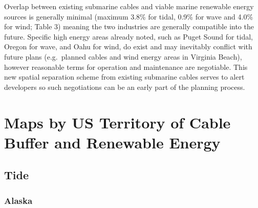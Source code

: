 \documentclass[]{article}
\begin{document}
Overlap between existing submarine cables and viable marine renewable
energy sources is generally minimal (maximum 3.8\% for tidal, 0.9\% for
wave and 4.0\% for wind; Table 3) meaning the two industries are
generally compatible into the future. Specific high energy areas already
noted, such as Puget Sound for tidal, Oregon for wave, and Oahu for
wind, do exist and may inevitably conflict with future plans
(e.g.~planned cables and wind energy areas in Virginia Beach), however
reasonable terms for operation and maintenance are negotiable. This new
spatial separation scheme from existing submarine cables serves to alert
developers so such negotiations can be an early part of the planning
process.

\newpage

\hypertarget{appendix-appendix}{%
\appendix}


\hypertarget{maps-by-us-territory-of-cable-buffer-and-renewable-energy}{%
\section{Maps by US Territory of Cable Buffer and Renewable
Energy}\label{maps-by-us-territory-of-cable-buffer-and-renewable-energy}}

\hypertarget{tide}{%
\subsection{Tide}\label{tide}}

\hypertarget{alaska}{%
\subsubsection{Alaska}\label{alaska}}
\end{document}
